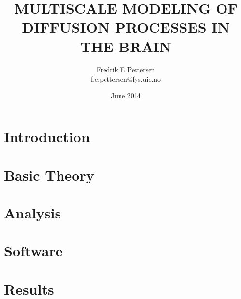 \documentclass[twoside,english]{uiofysmaster}
\author{Fredrik E Pettersen\\ f.e.pettersen@fys.uio.no}
\title{\uppercase{Multiscale modeling of diffusion processes in the brain}}
\date{June 2014}
\begin{document}

\cleardoublepage





\tableofcontents
\clearpage
\listoffigures

\clearpage
\printnomenclature


\chapter{Introduction}
\clearpage


\chapter{Basic Theory}



\chapter{Analysis}



\chapter{Software}



\chapter{Results}
\clearpage


\appendix
\chapter{}


\printbibliography
\end{document}
